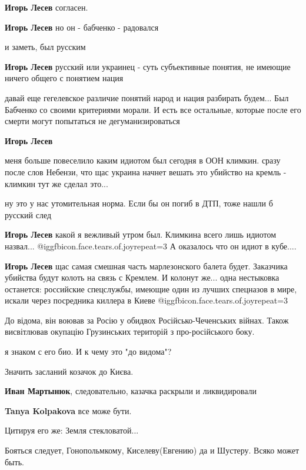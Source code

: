 \begin{itemize}
\begin{itemize}
\textbf{Игорь Лесев} согласен.

\textbf{Игорь Лесев} но он - бабченко - радовался

и заметь, был русским

\textbf{Игорь Лесев} русский или украинец - суть субъективные понятия, не имеющие ничего общего с понятием нация


давай еще гегелевское различие понятий народ и нация разбирать будем... Был
Бабченко со своими критериями морали. И есть все остальные, которые после его
смерти могут попытаться не дегуманизироваться


\textbf{Игорь Лесев} 

меня больше повеселило каким идиотом был сегодня в ООН климкин. сразу после
слов Небензи, что щас украина начнет вешать это убийство на кремль - климкин
тут же сделал это...


ну это у нас утомительная норма. Если бы он погиб в ДТП, тоже нашли б русский след

\textbf{Игорь Лесев} какой я вежливый утром был. Климкина всего лишь идиотом назвал... @igg{fbicon.face.tears.of.joy}{repeat=3} А оказалось что он идиот в кубе....

\textbf{Игорь Лесев} щас самая смешная часть марлезонского балета будет. Заказчика убийства будут колоть на связь с Кремлем. И колонут же... одна нестыковка останется: российские спецслужбы, имеющие один из лучших спецназов в мире, искали через посредника киллера в Киеве @igg{fbicon.face.tears.of.joy}{repeat=3} 
\end{itemize} %


До відома, він воював за Росію у обидвох Російсько-Чеченських війнах. Також
висвітлював окупацію Грузинських територій з про-російського боку.

\begin{itemize} %
я знаком с его био. И к чему это "до видома"?

Значить засланий козачок до Києва.

\textbf{Иван Мартынюк}, следовательно, казачка раскрыли и ликвидировали

\textbf{Tanya Kolpakova} все може бути.
\end{itemize} %

Цитируя его же: Земля стекловатой...

Бояться следует, Гонопольмкому, Киселеву(Евгению) да и Шустеру. Всяко может быть.

\end{itemize} %
